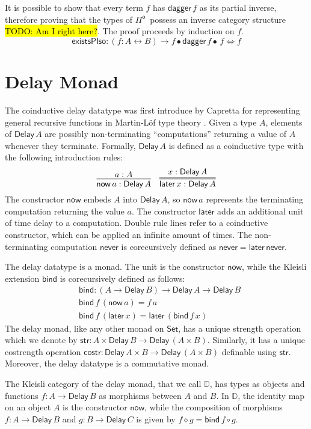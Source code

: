 \documentclass[runningheads,a4paper]{llncs}
\newcommand{\Pio}{\ensuremath{\mathsf{\Pi}^{\mathsf{o}}}}
\newcommand{\Set}{\mathsf{Set}}
\newcommand{\comp}{\circ}
\newcommand{\lr}{\longleftrightarrow}
\newcommand{\LR}{\iff}
\renewcommand{\dagger}{\mathsf{dagger}}
\newcommand{\Delay}{\ensuremath{\mathsf{Delay}\,}}
\newcommand{\now}{\mathsf{now}}
\newcommand{\later}{\mathsf{later}}
\newcommand{\never}{\mathsf{never}}
\newcommand{\bind}{\mathsf{bind}}
\newcommand{\str}{\mathsf{str}}
\newcommand{\costr}{\mathsf{costr}}
\newcommand{\D}{\mathbb{D}}
\newcommand{\todo}[1]{\hl{TODO: #1}}
\begin{document}
It is possible to show that every term $f$ has $\dagger\,f$ as its
partial inverse, therefore proving that the types of \Pio\ possess an
inverse category structure \todo{Am I right here?}. The proof proceeds by induction on $f$.
\[
\mathsf{existsPIso} : (f : A \lr B) \to f \bullet \dagger\,f
\bullet\,f \LR f
\]


\section{Delay Monad}\label{sec:delay}

The coinductive delay datatype was first introduce by Capretta for
representing general recursive functions in Martin-L\"of type theory
\cite{Capretta05}.  Given a type $A$, elements of $\Delay A$ are
possibly non-terminating ``computations'' returning a value of $A$
whenever they terminate. Formally, $\Delay A$ is defined as a
coinductive type with the following introduction rules:
\[
\infer{\now\,a : \Delay A}{a : A}
\quad
\infer={\later\,x : \Delay A}{x : \Delay A}
\]
The constructor $\now$ embeds $A$ into $\Delay A$, so $\now\,a$
represents the terminating computation returning the value $a$. The
constructor $\later$ adds an additional unit of time delay to a
computation. Double rule lines refer to a coinductive constructor,
which can be applied an infinite amount of times.
The non-terminating computation $\never$
is corecursively defined as $\never = \later \,\never$.

The delay datatype is a monad. The unit is the constructor $\now$,
while the Kleisli extension $\bind$ is corecursively defined as follows:
\begin{align*}
& \bind : (A \to \Delay B) \to \Delay A \to \Delay B \\
& \bind \,f \, (\now\,a) = f\,a \\
& \bind\,f\,(\later\,x) = \later\,(\bind\,f\,x)
\end{align*}
The delay monad, like any other monad on $\Set$, has a unique strength
operation which we denote by $\str : A \times \Delay B \to \Delay (A
\times B)$. Similarly, it has a unique costrength operation $\costr :
\Delay A \times B \to \Delay (A \times B)$ definable using $\str$. Moreover, the delay datatype is a commutative monad.

The Kleisli category of the delay monad, that we call $\D$, has types
as objects and functions $f : A \to \Delay B$ as morphisms between $A$
and $B$. In $\D$, the identity map on an object $A$ is the constructor
$\now$, while the composition of morphisms $f : A \to \Delay B$ and $g
: B \to \Delay C$ is given by $f \diamond g = \bind\,f \comp g$.
\end{document}
